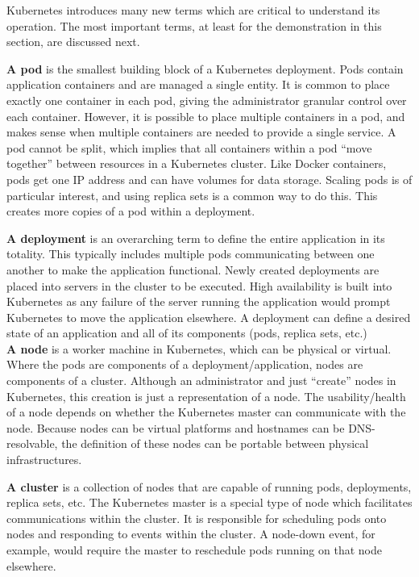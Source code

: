 Kubernetes introduces many new terms which are critical to understand its
operation. The most important terms, at least for the demonstration in this
section, are discussed next.

\textbf{A pod} is the smallest building block of a Kubernetes deployment. Pods
contain application containers and are managed a single entity. It is common
to place exactly one container in each pod, giving the administrator granular
control over each container. However, it is possible to place multiple
containers in a pod, and makes sense when multiple containers are needed to
provide a single service. A pod cannot be split, which implies that all
containers within a pod ``move together'' between resources in a Kubernetes
cluster. Like Docker containers, pods get one IP address and can have volumes
for data storage. Scaling pods is of particular interest, and using replica
sets is a common way to do this. This creates more copies of a pod within a
deployment.

\textbf{A deployment} is an overarching term to define the entire application
in its totality. This typically includes multiple pods communicating between
one another to make the application functional. Newly created deployments are
placed into servers in the cluster to be executed. High availability is built
into Kubernetes as any failure of the server running the application would
prompt Kubernetes to move the application elsewhere. A deployment can define a
desired state of an application and all of its components (pods, replica sets,
etc.) \\

\textbf{A node} is a worker machine in Kubernetes, which can be physical or
virtual. Where the pods are components of a deployment/application, nodes are
components of a cluster. Although an administrator and just ``create'' nodes in
Kubernetes, this creation is just a representation of a node. The
usability/health of a node depends on whether the Kubernetes master can
communicate with the node. Because nodes can be virtual platforms and
hostnames can be DNS-resolvable, the definition of these nodes can be portable
between physical infrastructures.

\textbf{A cluster} is a collection of nodes that are capable of running pods,
deployments, replica sets, etc. The Kubernetes master is a special type of
node which facilitates communications within the cluster. It is responsible
for scheduling pods onto nodes and responding to events within the cluster. A
node-down event, for example, would require the master to reschedule pods
running on that node elsewhere.

